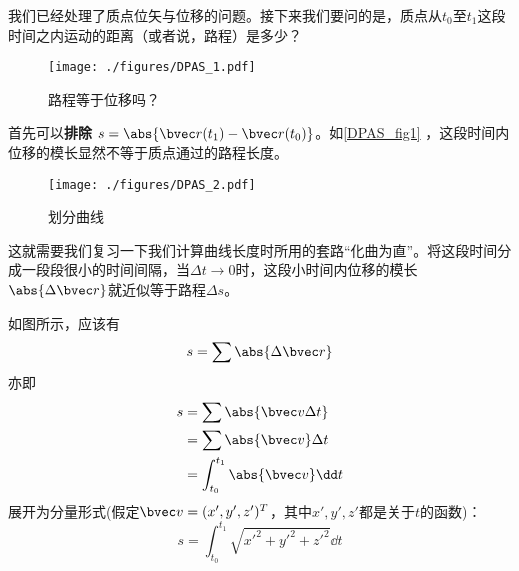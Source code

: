 
我们已经处理了质点位矢与位移的问题。接下来我们要问的是，质点从$t_0$至$t_1$这段时间之内运动的距离（或者说，路程）是多少？

\begin{figure}[ht]
\centering
\texttt{[image: ./figures/DPAS\_1.pdf]}
\caption{路程等于位移吗？} \label{DPAS_fig1}
\end{figure}

首先可以\textbf{排除} $s = \abs{\bvec r(t_1) - \bvec r(t_0)}  $。如\autoref{DPAS_fig1} ，这段时间内位移的模长显然不等于质点通过的路程长度。

\begin{figure}[ht]
\centering
\texttt{[image: ./figures/DPAS\_2.pdf]}
\caption{划分曲线} \label{DPAS_fig2}
\end{figure}

这就需要我们复习一下我们计算曲线长度时所用的套路“化曲为直”。将这段时间分成一段段很小的时间间隔，当$\Delta t \to 0$时，这段小时间内位移的模长$\abs{\Delta \bvec r}$就近似等于路程$\Delta s$。

如图所示，应该有$$s=\sum \abs{\Delta \bvec r}$$
亦即$$
\begin{aligned}
s&=\sum \abs{\bvec v \Delta t}\\
&=\sum \abs{\bvec v} \Delta t\\
&=\int _{t_0}^{t_1} \abs{\bvec v} \dd t\\
\end{aligned}
$$
展开为分量形式(假定$\bvec v = (x',y',z')^T$，其中$x',y',z'$都是关于$t$的函数)：
$$
s = \int _{t_0}^{t_1} \sqrt{x'^2+y'^2+z'^2} \dd t
$$

